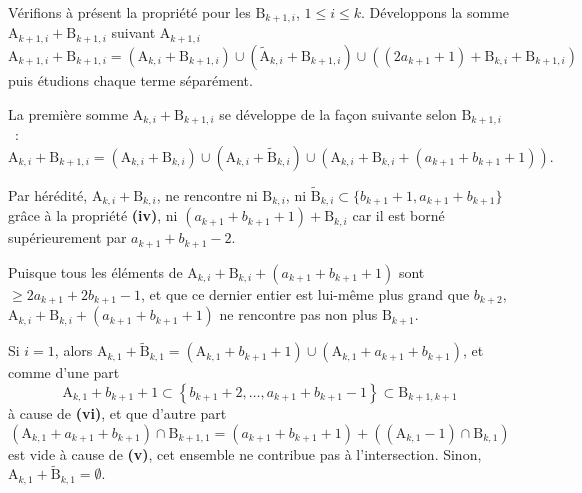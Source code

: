 \documentclass[11pt, oneside]{article}   	%
\newcommand{\interval}[2]{\left\{ #1, \dots, #2 \right\}}
\begin{document}
Vérifions à présent la propriété pour les $\mathrm{B}_{k + 1, i}$, $1 \leqslant i \leqslant k$.
Développons la somme $\mathrm{A}_{k + 1, i} + \mathrm{B}_{k + 1, i}$ suivant $\mathrm{A}_{k + 1, i}$
\begin{equation}
 \mathrm{A}_{k + 1, i} + \mathrm{B}_{k + 1, i} = (\mathrm{A}_{k, i} + \mathrm{B}_{k + 1, i}) \cup (\widetilde{\mathrm{A}}_{k, i} + \mathrm{B}_{k + 1, i})
 \cup ((2 a_{k+1} + 1) + \mathrm{B}_{k, i} + \mathrm{B}_{k + 1, i})
\end{equation}
puis étudions chaque terme séparément.


La première somme $\mathrm{A}_{k, i} + \mathrm{B}_{k + 1, i}$ se développe de la façon suivante selon $\mathrm{B}_{k + 1, i}$~:
\begin{equation}
 \mathrm{A}_{k, i} + \mathrm{B}_{k + 1, i} = (\mathrm{A}_{k, i} + \mathrm{B}_{k, i}) \cup (\mathrm{A}_{k, i} + \widetilde{\mathrm{B}}_{k, i})
   \cup (\mathrm{A}_{k, i} + \mathrm{B}_{k, i} + (a_{k+1} + b_{k+1} + 1)).
\end{equation}

Par hérédité, $\mathrm{A}_{k, i} + \mathrm{B}_{k, i}$, ne rencontre ni $\mathrm{B}_{k, i}$,
ni $\widetilde{\mathrm{B}}_{k, i} \subset \{ b_{k+1} + 1, a_{k+1} + b_{k+1}\}$ grâce à la propriété \textbf{(iv)},
ni $(a_{k+1} + b_{k+1} + 1) + \mathrm{B}_{k, i}$ car il est borné supérieurement par $a_{k + 1} + b_{k + 1} - 2$.

Puisque tous les éléments de $\mathrm{A}_{k, i} + \mathrm{B}_{k, i} + (a_{k+1} + b_{k+1} + 1)$ sont $\geqslant 2 a_{k+1} + 2 b_{k+1} - 1$,
et que ce dernier entier est lui-même plus grand que $b_{k + 2}$,
$\mathrm{A}_{k, i} + \mathrm{B}_{k, i} + (a_{k+1} + b_{k+1} + 1)$ ne rencontre pas non plus $\mathrm{B}_{k+1}$.

Si $i = 1$, alors $\mathrm{A}_{k, 1} + \widetilde{\mathrm{B}}_{k, 1} = (\mathrm{A}_{k, 1} + b_{k+1} + 1) \cup (\mathrm{A}_{k, 1} + a_{k+1} + b_{k+1})$,
et comme d'une part
\begin{equation}
 \mathrm{A}_{k, 1} + b_{k+1} + 1 \subset \interval{b_{k+1} + 2}{a_{k+1} + b_{k+1} - 1} \subset \mathrm{B}_{k + 1, k + 1}
\end{equation}
à cause de \textbf{(vi)}, et que d'autre part
\begin{equation}
 (\mathrm{A}_{k, 1} + a_{k+1} + b_{k+1}) \cap \mathrm{B}_{k+1, 1} = (a_{k + 1} + b_{k + 1} + 1) + ((\mathrm{A}_{k, 1} - 1) \cap \mathrm{B}_{k, 1})
\end{equation}
est vide à cause de \textbf{(v)},
cet ensemble ne contribue pas à l'intersection.
Sinon, $\mathrm{A}_{k, 1} + \widetilde{\mathrm{B}}_{k, 1} = \emptyset$.
\end{document}
